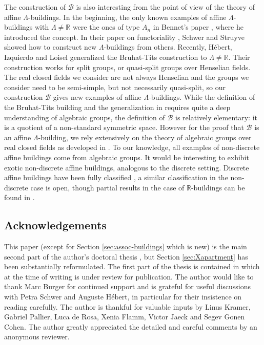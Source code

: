 \documentclass[12pt]{amsart}
\newcommand{\R}{\mathbb{R} }
\newcommand{\B}{\mathcal{B}}
\numberwithin{equation}{section}
\theoremstyle{remark} %
\begin{document}
The construction of $\B$ is also interesting from the point of view of the theory of affine $\Lambda$-buildings. In the beginning, the only known examples of affine $\Lambda$-buildings with $\Lambda \neq \R$ were the ones of type $A_n$ in Bennet's paper \cite{Ben1}, where he introduced the concept. In their paper on functoriality \cite{ScSt12}, Schwer and Struyve showed how to construct new $\Lambda$-buildings from others. Recently, H\'ebert, Izquierdo and Loisel \cite{HIL23} generalized the Bruhat-Tits construction to $\Lambda\neq \R$. Their construction works for split groups, or quasi-split groups over Henselian fields. The real closed fields we consider are not always Henselian and the groups we consider need to be semi-simple, but not necessarily quasi-split, so our construction $\B$ gives new examples of affine $\Lambda$-buildings. While the definition of the Bruhat-Tits building \cite{BrTi,BrTi84} and the generalization in \cite{HIL23} requires quite a deep understanding of algebraic groups, the definition of $\B$ is relatively elementary: it is a quotient of a non-standard symmetric space. However for the proof that $\B$ is an affine $\Lambda$-building, we rely extensively on the theory of algebraic groups over real closed fields as developed in \cite{AppAGRCF}. To our knowledge, all examples of non-discrete affine buildings come from algebraic groups. It would be interesting to exhibit exotic non-discrete affine buildings, analogous to the discrete setting. Discrete affine buildings have been fully classified \cite{Wei09}, a similar classification in the non-discrete case is open, though partial results in the case of $\mathbb{R}$-buildings can be found in \cite{Tit86}.

\subsection{Acknowledgements}

This paper (except for Section \ref{sec:assoc-buildings} which is new) is the main second part of the author's doctoral thesis \cite{App24thesis}, but Section \ref{sec:Xapartment} has been substantially reformulated. The first part of the thesis is contained in \cite{AppAGRCF} which at the time of writing is under review for publication. The author would like to thank Marc Burger for continued support and is grateful for useful discussions with Petra Schwer and Auguste Hébert, in particular for their insistence on reading \cite{BrTi} carefully. The author is thankful for valuable inputs by Linus Kramer, Gabriel Pallier, Luca de Rosa, Xenia Flamm, Victor Jaeck and Segev Gonen Cohen. The author greatly appreciated the detailed and careful comments by an anonymous reviewer.
\end{document}
